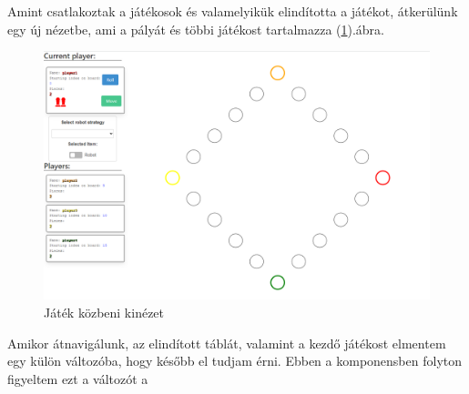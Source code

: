\documentclass[a4paper,twoside]{article}
\begin{document}
Amint csatlakoztak a játékosok és valamelyikük elindította a játékot, átkerülünk egy új nézetbe, ami a pályát és többi játékost tartalmazza (\ref{playingboard}).ábra.
\begin{figure}
	\caption{Játék közbeni kinézet}
	\label{playingboard}
	\centering
	\includegraphics[scale=0.4]{playingboard}
\end{figure}
\FloatBarrier
Amikor átnavigálunk, az elindított táblát, valamint a kezdő játékost elmentem egy külön változóba, hogy később el tudjam érni. Ebben  a komponensben folyton figyeltem ezt a változót a
\end{document}
